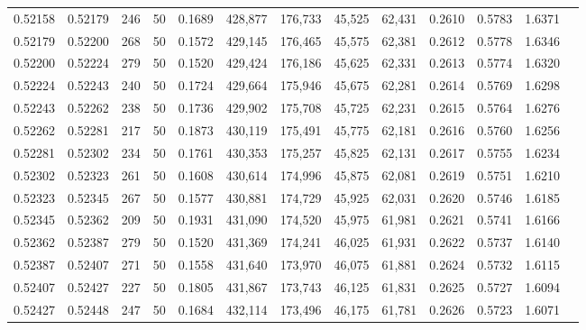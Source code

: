 \begin{tabular}{rrrrrrrrrrrrr}
0.52158 & 0.52179 &   246 &  50 &                                     0.1689 & 428,877 & 176,733 &  45,525 &  62,431 & 0.2610 & 0.5783 & 1.6371 \\
0.52179 & 0.52200 &   268 &  50 &                                     0.1572 & 429,145 & 176,465 &  45,575 &  62,381 & 0.2612 & 0.5778 & 1.6346 \\
0.52200 & 0.52224 &   279 &  50 &                                     0.1520 & 429,424 & 176,186 &  45,625 &  62,331 & 0.2613 & 0.5774 & 1.6320 \\
0.52224 & 0.52243 &   240 &  50 &                                     0.1724 & 429,664 & 175,946 &  45,675 &  62,281 & 0.2614 & 0.5769 & 1.6298 \\
0.52243 & 0.52262 &   238 &  50 &                                     0.1736 & 429,902 & 175,708 &  45,725 &  62,231 & 0.2615 & 0.5764 & 1.6276 \\
0.52262 & 0.52281 &   217 &  50 &                                     0.1873 & 430,119 & 175,491 &  45,775 &  62,181 & 0.2616 & 0.5760 & 1.6256 \\
0.52281 & 0.52302 &   234 &  50 &                                     0.1761 & 430,353 & 175,257 &  45,825 &  62,131 & 0.2617 & 0.5755 & 1.6234 \\
0.52302 & 0.52323 &   261 &  50 &                                     0.1608 & 430,614 & 174,996 &  45,875 &  62,081 & 0.2619 & 0.5751 & 1.6210 \\
0.52323 & 0.52345 &   267 &  50 &                                     0.1577 & 430,881 & 174,729 &  45,925 &  62,031 & 0.2620 & 0.5746 & 1.6185 \\
0.52345 & 0.52362 &   209 &  50 &                                     0.1931 & 431,090 & 174,520 &  45,975 &  61,981 & 0.2621 & 0.5741 & 1.6166 \\
0.52362 & 0.52387 &   279 &  50 &                                     0.1520 & 431,369 & 174,241 &  46,025 &  61,931 & 0.2622 & 0.5737 & 1.6140 \\
0.52387 & 0.52407 &   271 &  50 &                                     0.1558 & 431,640 & 173,970 &  46,075 &  61,881 & 0.2624 & 0.5732 & 1.6115 \\
0.52407 & 0.52427 &   227 &  50 &                                     0.1805 & 431,867 & 173,743 &  46,125 &  61,831 & 0.2625 & 0.5727 & 1.6094 \\
0.52427 & 0.52448 &   247 &  50 &                                     0.1684 & 432,114 & 173,496 &  46,175 &  61,781 & 0.2626 & 0.5723 & 1.6071 \\

\end{tabular}
